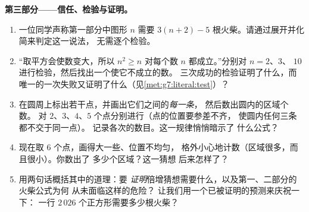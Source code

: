 \begin{problem}
\medskip
\noindent\textbf{第三部分——信任、检验与证明。}
\begin{enumerate}[resume]
  \item 一位同学声称第一部分中图形 $n$ 需要
        $3(n + 2) - 5$ 根火柴。请通过展开并化简来判定这一说法，
        无需逐个检验。
  \item “取平方会使数变大，所以 $n^2 \geq n$ 对每个数
        $n$ 都成立。”分别对 $n = 2$、$3$、
        $10$ 进行检验，然后找出一个使它不成立的数。
        三次成功的检验证明了什么，而
        唯一的一次失败又证明了什么（见\cref{met:g7:literal:test}）？
  \item 在圆周上标出若干点，并画出它们之间的\emph{每一条}，
        然后数出圆内的区域个数。
        对 $2$、$3$、$4$、$5$ 个点分别进行（点的位置要参差不齐，
        使圆内任何三条都不交于同一点）。
        记录各次的数目。这一规律悄悄暗示了
        什么公式？
  \item 现在取 $6$ 个点，画得大一些、位置不均匀，
        格外小心地计数（区域很多，而且很小）。你数出了
        多少个区域？这一猜想
        后来怎样了？
  \item 用两句话概括其中的道理：要
        \emph{证明}倍增猜想需要什么，以及第一、二部分的火柴公式为何
        从未面临这样的危险？
        让我们用一个已被证明的预测来庆祝一下：
        一行 $2\,026$ 个正方形需要多少根火柴？
\end{enumerate}
\end{problem}
